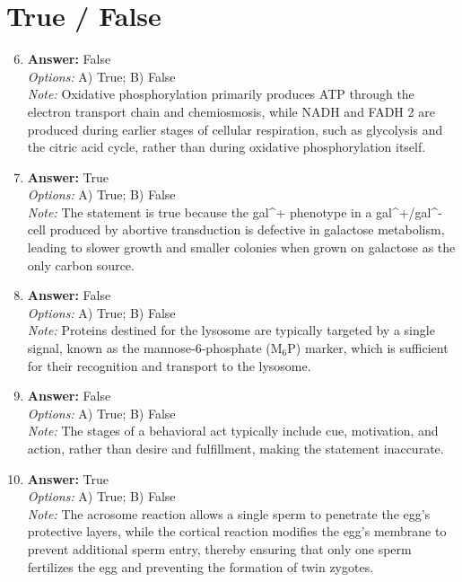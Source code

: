 \documentclass[12pt]{article}
\begin{document}
\section*{True / False}
\begin{enumerate}[label=\arabic*.]
\setcounter{enumi}{5}
\item \textbf{Answer:} False
\\ \textit{Options:} A) True; B) False
\\ \textit{Note:} Oxidative phosphorylation primarily produces ATP through the electron transport chain and chemiosmosis, while NADH and FADH 2 are produced during earlier stages of cellular respiration, such as glycolysis and the citric acid cycle, rather than during oxidative phosphorylation itself.
\item \textbf{Answer:} True
\\ \textit{Options:} A) True; B) False
\\ \textit{Note:} The statement is true because the gal^+ phenotype in a gal^+/gal^- cell produced by abortive transduction is defective in galactose metabolism, leading to slower growth and smaller colonies when grown on galactose as the only carbon source.
\item \textbf{Answer:} False
\\ \textit{Options:} A) True; B) False
\\ \textit{Note:} Proteins destined for the lysosome are typically targeted by a single signal, known as the mannose-6-phosphate (M$_{6}$P) marker, which is sufficient for their recognition and transport to the lysosome.
\item \textbf{Answer:} False
\\ \textit{Options:} A) True; B) False
\\ \textit{Note:} The stages of a behavioral act typically include cue, motivation, and action, rather than desire and fulfillment, making the statement inaccurate.
\item \textbf{Answer:} True
\\ \textit{Options:} A) True; B) False
\\ \textit{Note:} The acrosome reaction allows a single sperm to penetrate the egg's protective layers, while the cortical reaction modifies the egg's membrane to prevent additional sperm entry, thereby ensuring that only one sperm fertilizes the egg and preventing the formation of twin zygotes.
\end{enumerate}
\end{document}
